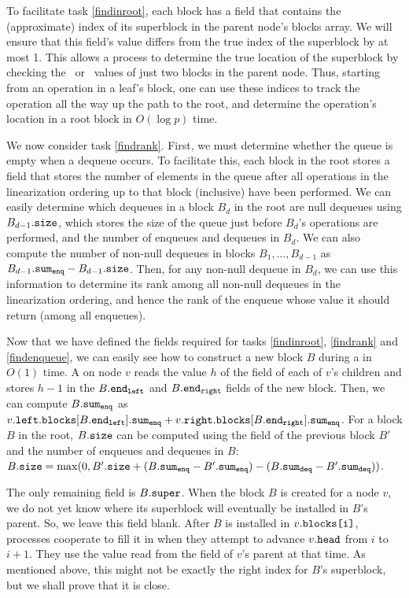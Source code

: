 To facilitate task \ref{findinroot}, each block has a field  that contains
the (approximate) index of its superblock in the parent node's blocks array.
We will ensure that this field's value differs from the true index of the superblock by at most 1.
This allows a process to determine the true location of the superblock by checking the \eleft\ or \eright\ values of just two blocks in the parent node.
Thus, starting from an operation in a leaf's block, one can use these indices to track the 
operation all the way up the path to the root, and determine the operation's location in a root block
in $O(\log p)$ time.

We now consider task \ref{findrank}.
First, we must determine whether the queue is empty when a dequeue occurs.
To facilitate this, each block in the root stores a  field that stores the number of elements
in the queue after all operations in the linearization ordering up to that block (inclusive) 
have been performed.
We can easily determine which dequeues in a block $B_d$ in the root are null dequeues using
$B_{d-1}.{\normalfont{\texttt{size}}}$, which stores the size of the queue just before $B_d$'s operations are performed, and the number of enqueues and dequeues in $B_d$.
We can also compute the number of non-null dequeues in blocks $B_1, \ldots, B_{d-1}$ 
as $B_{d-1}.{\normalfont{\texttt{sum\textsubscript{enq}}}}-B_{d-1}.{\normalfont{\texttt{size}}}$.
Then, for any non-null dequeue in $B_d$, we can use this information to determine its
rank among all non-null dequeues in the linearization ordering, and hence the rank of the enqueue
whose value it should return (among all enqueues).

Now that we have defined the fields required for tasks \ref{findinroot}, \ref{findrank} and \ref{findenqueue},
we can easily see how to construct a new block $B$ during a  in $O(1)$ time.
A  on node $v$ reads the value $h$ of the  field of each of $v$'s children and stores 
$h-1$ in the $B.{\normalfont{\texttt{end\textsubscript{left}}}}$ and $B.{\normalfont{\texttt{end\textsubscript{right}}}}$ fields of the new block.
Then, we can compute $B.{\normalfont{\texttt{sum\textsubscript{enq}}}}$ as $v.{\normalfont{\texttt{left}}}.{\normalfont{\texttt{blocks}}}[B.{\normalfont{\texttt{end\textsubscript{left}}}}].{\normalfont{\texttt{sum\textsubscript{enq}}}} + v.{\normalfont{\texttt{right}}}.{\normalfont{\texttt{blocks}}}[B.{\normalfont{\texttt{end\textsubscript{right}}}}].{\normalfont{\texttt{sum\textsubscript{enq}}}}$.
For a block $B$ in the root, $B.{\normalfont{\texttt{size}}}$ can be computed using the  field of the previous block $B'$ and
the number of enqueues and dequeues in $B$:
$B.{\normalfont{\texttt{size}}} = \max(0, B'.{\normalfont{\texttt{size}}} + (B.{\normalfont{\texttt{sum\textsubscript{enq}}}}-B'.{\normalfont{\texttt{sum\textsubscript{enq}}}}) - (B.{\normalfont{\texttt{sum\textsubscript{deq}}}} - B'.{\normalfont{\texttt{sum\textsubscript{deq}}}}))$.

The only remaining field is $B.{\normalfont{\texttt{super}}}$.  When the block 
$B$ is created for a node $v$, we do not yet know where its
superblock will eventually be installed in $B$'s parent.
So, we leave this field blank.  After $B$ is installed 
in $v.{\normalfont{\texttt{blocks[i]}}}$, processes cooperate to fill it in 
when they attempt to advance $v.{\normalfont{\texttt{head}}}$ from $i$ to $i+1$.
They use the value read from the  field of $v$'s parent at that time.
As mentioned above, this might not be exactly the right index for $B$'s superblock, but we
shall prove that it is close.


